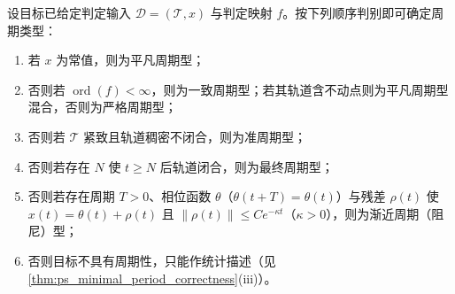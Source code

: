 \begin{proposition}[周期类型的判别准则]\label{prop:ps_type_discrimination}
设目标已给定判定输入 $\mathcal{D}=(\mathcal{T},x)$ 与判定映射 $f$。按下列顺序判别即可确定周期类型：
\begin{enumerate}[label=(\roman*)]
    \item 若 $x$ 为常值，则为平凡周期型；
    \item 否则若 $\operatorname{ord}(f)<\infty$，则为一致周期型；若其轨道含不动点则为平凡周期型混合，否则为严格周期型；
    \item 否则若 $\mathcal{T}$ 紧致且轨道稠密不闭合，则为准周期型；
    \item 否则若存在 $N$ 使 $t\ge N$ 后轨道闭合，则为最终周期型；
    \item 否则若存在周期 $T>0$、相位函数 $\theta$（$\theta(t+T)=\theta(t)$）与残差 $\rho(t)$ 使 $x(t)=\theta(t)+\rho(t)$ 且 $\|\rho(t)\|\le Ce^{-\kappa t}$（$\kappa>0$），则为渐近周期（阻尼）型；
    \item 否则目标不具有周期性，只能作统计描述（见 \cref{thm:ps_minimal_period_correctness}(iii)）。
\end{enumerate}
\end{proposition}

